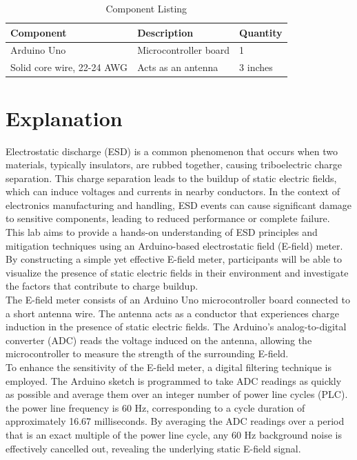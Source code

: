 \documentclass[a4paper,11pt]{article}%
\begin{document}
\begin{table}[H]
  \centering
  \caption{Component Listing}
  \begin{tabular}{|l|l|l|}
    \hline
    \textbf{Component}         & \textbf{Description}  & \textbf{Quantity} \\ \hline
    Arduino Uno                & Microcontroller board & 1                 \\ \hline
    Solid core wire, 22-24 AWG & Acts as an antenna    & 3 inches          \\ \hline
  \end{tabular}
\end{table}



\section{Explanation}

Electrostatic discharge (ESD) is a common phenomenon that occurs when two materials, typically insulators, are rubbed together, causing triboelectric charge separation. This charge separation leads to the buildup of static electric fields, which can induce voltages and currents in nearby conductors. In the context of electronics manufacturing and handling, ESD events can cause significant damage to sensitive components, leading to reduced performance or complete failure.\\

This lab aims to provide a hands-on understanding of ESD principles and mitigation techniques using an Arduino-based electrostatic field (E-field) meter. By constructing a simple yet effective E-field meter, participants will be able to visualize the presence of static electric fields in their environment and investigate the factors that contribute to charge buildup.\\

The E-field meter consists of an Arduino Uno microcontroller board connected to a short antenna wire. The antenna acts as a conductor that experiences charge induction in the presence of static electric fields. The Arduino's analog-to-digital converter (ADC) reads the voltage induced on the antenna, allowing the microcontroller to measure the strength of the surrounding E-field.\\

To enhance the sensitivity of the E-field meter, a digital filtering technique is employed. The Arduino sketch is programmed to take ADC readings as quickly as possible and average them over an integer number of power line cycles (PLC). the power line frequency is 60 Hz, corresponding to a cycle duration of approximately 16.67 milliseconds. By averaging the ADC readings over a period that is an exact multiple of the power line cycle, any 60 Hz background noise is effectively cancelled out, revealing the underlying static E-field signal.\\
\end{document}
